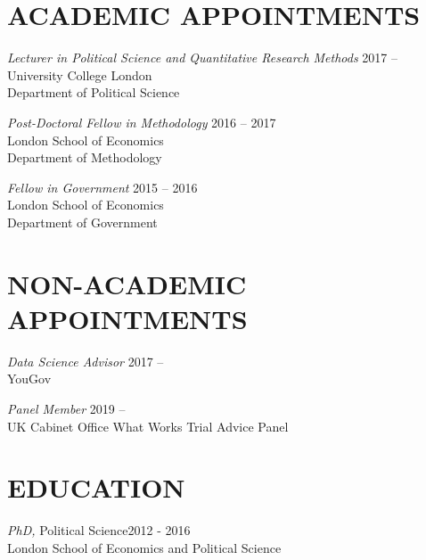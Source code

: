 \documentclass[centered]{res}
\begin{document}
 
\address{Department of Political Science \\ University College London\\ Gower Street \\ London \\ WC1E 6BT }

\address{\faEnvelope \hfil \textcolor{white}{hi}\href{mailto:j.blumenau@ucl.ac.uk}{j.blumenau@ucl.ac.uk} \\ \faHome \hfil\href{http://www.jackblumenau.com}{jackblumenau.com} }%

 
\begin{resume}

\section{ACADEMIC APPOINTMENTS} 
{\sl Lecturer in Political Science and Quantitative Research Methods} \hfill 2017 --\\
University College London\\
Department of Political Science

{\sl Post-Doctoral Fellow in Methodology} \hfill 2016 -- 2017\\
London School of Economics\\
Department of Methodology

{\sl Fellow in Government} \hfill 2015 -- 2016\\
London School of Economics\\
Department of Government

\section{NON-ACADEMIC APPOINTMENTS}

{\sl Data Science Advisor} \hfill 2017 --\\
YouGov

{\sl Panel Member} \hfill 2019 --\\
UK Cabinet Office What Works Trial Advice Panel


\section{EDUCATION} 

		{\sl PhD,} Political Science\hfill 2012 - 2016\\
                London School of Economics and Political Science


\end{resume}
\end{document}
